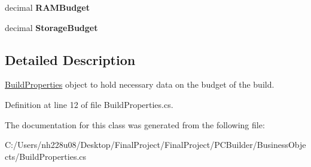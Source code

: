 \begin{DoxyCompactItemize}
\item 
decimal {\bfseries R\+A\+M\+Budget}\hypertarget{class_business_objects_1_1_build_properties_a43c5545428656e0f07cd3fa6674abace}{}\label{class_business_objects_1_1_build_properties_a43c5545428656e0f07cd3fa6674abace}

\item 
decimal {\bfseries Storage\+Budget}\hypertarget{class_business_objects_1_1_build_properties_a4c0a340000beda0f71bb35bf7ba7ee3a}{}\label{class_business_objects_1_1_build_properties_a4c0a340000beda0f71bb35bf7ba7ee3a}

\end{DoxyCompactItemize}


\subsection{Detailed Description}
\hyperlink{class_business_objects_1_1_build_properties}{Build\+Properties} object to hold necessary data on the budget of the build. 



Definition at line 12 of file Build\+Properties.\+cs.



The documentation for this class was generated from the following file\+:\begin{DoxyCompactItemize}
\item 
C\+:/\+Users/nh228u08/\+Desktop/\+Final\+Project/\+Final\+Project/\+P\+C\+Builder/\+Business\+Objects/Build\+Properties.\+cs\end{DoxyCompactItemize}
